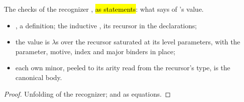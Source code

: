 \begin{lemma}
  \label{lem:EraseProof-casesOn_shape}
  \leanok
   The checks of the recognizer , \hl{as statements}: what
   says of 's value.
  \begin{itemize}
  \item {}, a definition;  the inductive , its recursor in
        the declarations;
  \item the value is $\lambda$s over the recursor saturated at its level parameters, with the
        parameter, motive, index and major binders in place;
  \item each own minor, peeled to its arity read from the recursor's type, is the canonical
        body.
  \end{itemize}
\end{lemma}
\begin{proof}
  \leanok
   Unfolding of the recognizer;  and  as equations.
\end{proof}

